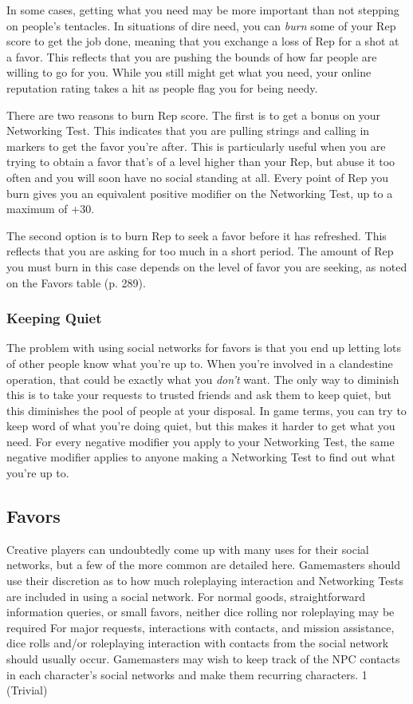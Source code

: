 In some cases, getting what you need may be more 
important than not stepping on people's tentacles. In 
situations of dire need, you can \textit{burn }some of your 
Rep score to get the job done, meaning that you exchange
a loss of Rep for a shot at a favor. This reflects
that you are pushing the bounds of how far people are 
willing to go for you. While you still might get what 
you need, your online reputation rating takes a hit as 
people flag you for being needy.

There are two reasons to burn Rep score. The first 
is to get a bonus on your Networking Test. This indicates
that you are pulling strings and calling in markers
to get the favor you're after. This is particularly
useful when you are trying to obtain a favor that's of 
a level higher than your Rep, but abuse it too often 
and you will soon have no social standing at all. Every 
point of Rep you burn gives you an equivalent positive
modifier on the Networking Test, up to a maximum
of +30.

The second option is to burn Rep to seek a favor 
before it has refreshed. This reflects that you are asking 
for too much in a short period. The amount of Rep 
you must burn in this case depends on the level of favor 
you are seeking, as noted on the Favors table (p. 289).

\subsubsection{Keeping Quiet}

The problem with using social networks for favors is 
that you end up letting lots of other people know what 
you're up to. When you're involved in a clandestine 
operation, that could be exactly what you \textit{don't} want. 
The only way to diminish this is to take your requests 
to trusted friends and ask them to keep quiet, but this 
diminishes the pool of people at your disposal.
In game terms, you can try to keep word of what 
you're doing quiet, but this makes it harder to get 
what you need. For every negative modifier you apply 
to your Networking Test, the same negative modifier 
applies to anyone making a Networking Test to find 
out what you're up to.

\subsection{Favors}

Creative players can undoubtedly come up with many 
uses for their social networks, but a few of the more 
common are detailed here.
Gamemasters should use their discretion as to how 
much roleplaying interaction and Networking Tests 
are included in using a social network. For normal 
goods, straightforward information queries, or small 
favors, neither dice rolling nor roleplaying may be required
For major requests, interactions with contacts,
and mission assistance, dice rolls and/or roleplaying 
interaction with contacts from the social network 
should usually occur. Gamemasters may wish to keep 
track of the NPC contacts in each character's social 
networks and make them recurring characters.
1 (Trivial)

